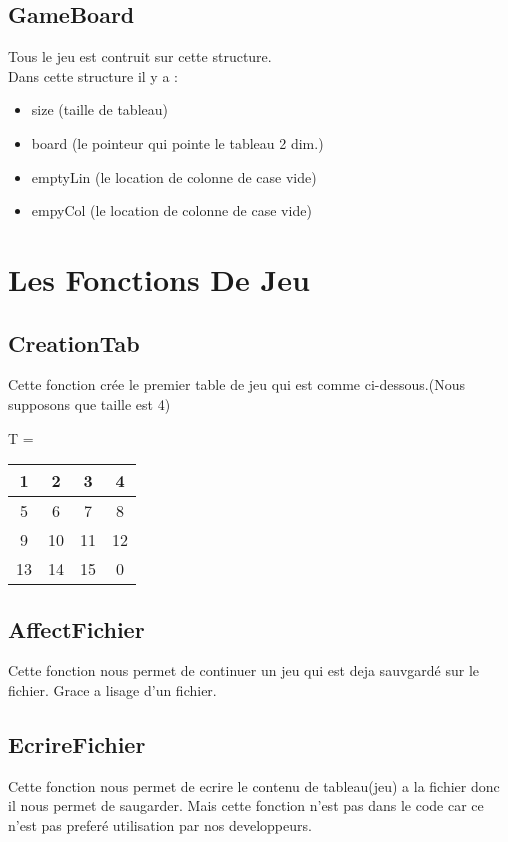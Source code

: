\documentclass{article}
\begin{document}
\subsection{GameBoard}
Tous le jeu est contruit sur cette structure.
\\
Dans cette structure il y a : \\

\begin{itemize}
	\item size (taille de tableau)
	\item board (le pointeur qui pointe le tableau 2 dim.)
	\item emptyLin (le location de colonne de case vide)
	\item empyCol (le location de colonne de case vide)
\end{itemize}

\newpage

\section{Les Fonctions De Jeu}

\subsection{CreationTab}
Cette fonction crée le premier table de jeu qui est comme ci-dessous.(Nous supposons que taille est 4) \\

\begin{center}
	T =
	\begin{tabular}{|c|c|c|c|} \hline
	 1 & 2 & 3 & 4 \\  \hline
	 5 & 6 & 7 & 8 \\  \hline
	 9 & 10 & 11 & 12 \\ \hline
	13 & 14 & 15 & 0 \\ \hline
	\end{tabular}
\end{center}
 

\subsection{AffectFichier}
Cette fonction nous permet de continuer un jeu qui est deja sauvgardé sur le fichier. Grace a lisage d'un fichier.

\subsection{EcrireFichier}
Cette fonction nous permet de ecrire le contenu de tableau(jeu) a la fichier donc il nous permet de saugarder.
Mais cette fonction n'est pas dans le code car ce n'est pas preferé utilisation par nos developpeurs.
\end{document}

